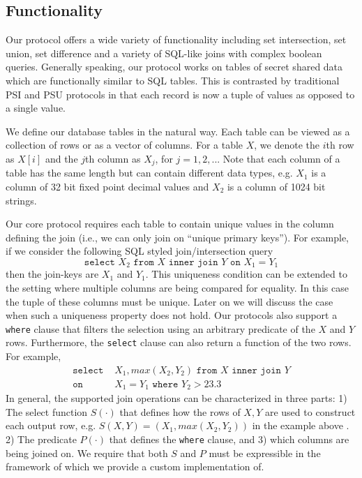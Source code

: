 \subsection{Functionality}

Our protocol offers a wide variety of functionality including set intersection, set union, set difference and a variety of SQL-like joins with complex boolean queries. Generally speaking, our protocol works on tables of secret shared data which are functionally similar to SQL tables. This is contrasted by traditional PSI and PSU protocols\cite{usenix:PSZ14,USENIX:PSSZ15,PSZ16,CCS:KKRT16} in that each record is now a tuple of values as opposed to a single value. 

We define our database tables in the natural way. Each table can be viewed as a collection of rows or as a vector of columns. For a table $X$, we denote the $i$th row as $X[i]$ and the $j$th column as $X_j$, for $j=1,2,...$ 
\iffullversion
Note that each column of a table has the same length but can contain different data types, e.g. $X_1$ is a column of 32 bit fixed point decimal values and $X_2$ is a column of 1024 bit strings.

\fi
Our core protocol requires each table to contain unique values in the column defining the join  (i.e., we can only join on ``unique primary keys''). For example, if we consider the following SQL styled join/intersection query
$$
\texttt{select } X_2 \texttt{ from } X \texttt{ inner join } Y \texttt{ on } X_1 = Y_1
$$
then the join-keys are $X_1$ and $Y_1$. This uniqueness condition can be extended to the setting where multiple columns are being compared for equality. 
\iffullversion
In this case the tuple of these columns must be unique. 
\fi
Later on we will discuss the case when such a uniqueness property does not hold. Our protocols also support a \texttt{where} clause that filters the selection using an arbitrary predicate of the $X$ and $Y$ rows. Furthermore, the \texttt{select} clause can also return a function of the two rows. For example,
\begin{align*}
\texttt{select }&  X_1,max(X_2, Y_2)  \texttt{ from } X \texttt{ inner join } Y \\
\texttt{on }& X_1 = Y_1 \texttt{ where } Y_2 > 23.3
\end{align*}
In general, the supported join operations can be characterized in three parts: 1) The select function $S(\cdot)$ that defines how the rows of $X,Y$ are used to construct each output row, e.g. $S(X,Y)=(X_1, max(X_2,Y_2))$
\iffullversion
in the example above
\fi. 2) The predicate $P(\cdot)$ that defines the \texttt{where} clause, and 3) which columns are being joined on.
\iffullversion
 We require that both $S$ and $P$ must be expressible in the framework of \cite{aby3} which we provide a custom implementation of.
\fi

